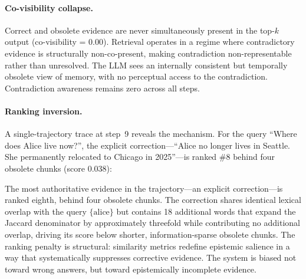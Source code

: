 \documentclass[letterpaper,twocolumn,10pt]{article}
\begin{document}
\paragraph{Co-visibility collapse.} Correct and obsolete evidence are never simultaneously present in the top-$k$ output (co-visibility = 0.00). Retrieval operates in a regime where contradictory evidence is structurally non-co-present, making contradiction non-representable rather than unresolved. The LLM sees an internally consistent but temporally obsolete view of memory, with no perceptual access to the contradiction. Contradiction awareness remains zero across all steps.

\paragraph{Ranking inversion.} A single-trajectory trace at step~9 reveals the mechanism. For the query ``Where does Alice live now?'', the explicit correction---``Alice no longer lives in Seattle. She permanently relocated to Chicago in 2025''---is ranked \#8 behind four obsolete chunks (score 0.038):

\begin{center}
\end{center}

The most authoritative evidence in the trajectory---an explicit correction---is ranked eighth, behind four obsolete chunks. The correction shares identical lexical overlap with the query $\{\text{alice}\}$ but contains 18 additional words that expand the Jaccard denominator by approximately threefold while contributing no additional overlap, driving its score below shorter, information-sparse obsolete chunks. The ranking penalty is structural: similarity metrics redefine epistemic salience in a way that systematically suppresses corrective evidence. The system is biased not toward wrong answers, but toward epistemically incomplete evidence.
\end{document}
